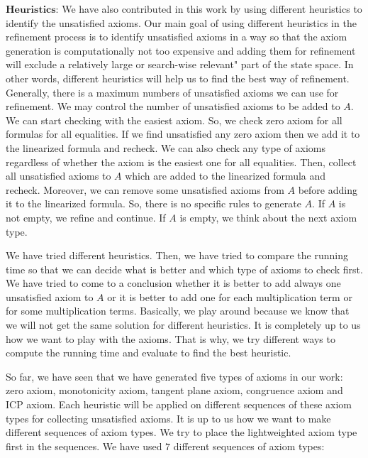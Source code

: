 \noindent  $\textbf{Heuristics:}$ We have also contributed in this work by using different heuristics to identify the unsatisfied axioms.
Our main goal of using different heuristics in the refinement process is to identify unsatisfied axioms in a way so that the axiom generation is computationally not too expensive and adding them for refinement will exclude a relatively large or search-wise relevant" part of the state space.
In other words, different heuristics will help us to find the best way of refinement.
Generally, there is a maximum numbers of unsatisfied axioms we can use for refinement.
We may control the number of unsatisfied axioms to be added to $A$.
We can start checking with the easiest axiom. 
So, we check zero axiom for all formulas for all equalities.
If we find unsatisfied any zero axiom then we add it to the linearized formula and recheck.
We can also check any type of axioms regardless of whether the axiom is the easiest one for all equalities.
Then, collect all unsatisfied axioms to $A$ which are added to the linearized formula  and recheck.
Moreover, we can remove some unsatisfied axioms from $A$ before adding it to the linearized formula.
So, there is no specific rules to generate $A$.
If $A$ is not empty, we refine and continue. 
If $A$ is empty, we think about the next axiom type.\newline

\noindent We have tried different heuristics.
Then, we have tried to compare the running time so that we can decide what is better and which type of axioms to check first.
We have tried to come to a conclusion whether it is better to add always one unsatisfied axiom to $A$ or it is better to add one for each multiplication term or for some multiplication terms.
Basically, we play around because we know that we will not get the same solution for different heuristics.
It is completely up to us how we want to play with the axioms.
That is why, we try different ways to compute the running time and evaluate to find the best heuristic.\newline

\noindent So far, we have seen that we have generated five types of axioms in our work: zero axiom, monotonicity axiom, tangent plane axiom, congruence axiom and ICP axiom.
Each heuristic will be applied on different sequences of these axiom types for collecting unsatisfied axioms.
It is up to us how we want to make different sequences of axiom types.
We try to place the lightweighted axiom type first in the sequences.
We have used $7$ different sequences of axiom types:

